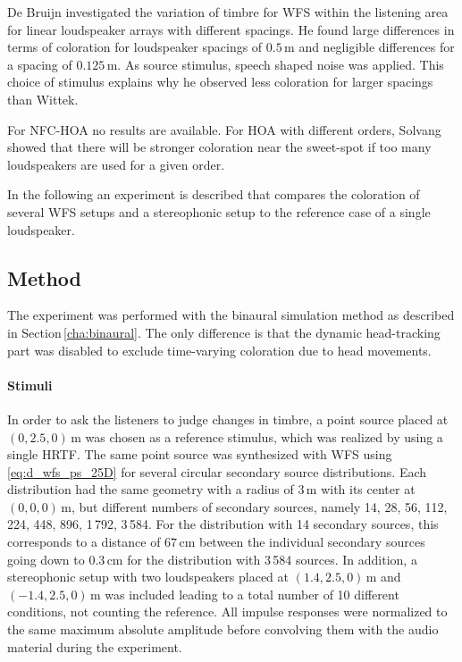 De Bruijn\autocite{DeBrujin2004} investigated the variation of
timbre for \ac{WFS} within the listening area for linear loudspeaker arrays
with different spacings.
He found large differences in terms of coloration for loudspeaker spacings of $0.5$\,m
and negligible differences for a spacing of $0.125$\,m. As source stimulus, speech shaped
noise was applied. This choice of stimulus explains why he observed less
coloration for larger spacings than Wittek.

For \ac{NFC-HOA} no results are available. For \ac{HOA} with different orders,
Solvang showed that there will be stronger coloration near
the sweet-spot if too many loudspeakers are used for a given order.

In the following an experiment is described that compares the coloration of several \ac{WFS} setups and a
stereophonic setup to the reference case of a single loudspeaker.


\subsection{Method}
\label{sec:coloration_method}
%

The experiment was performed with the binaural simulation method as described in
Section\,\ref{cha:binaural}. The only difference is that the dynamic
head-tracking part was disabled to exclude time-varying coloration due to head
movements.

\paragraph{Stimuli}
%
In order to ask the listeners to judge changes in timbre, a point source placed at
$(0,2.5,0)$\,m was chosen as a reference stimulus, which was realized by using a
single \ac{HRTF}. The same point source was synthesized with \ac{WFS} using
\eqref{eq:d_wfs_ps_25D} for several circular secondary source distributions.
Each distribution had the
same geometry with a radius of $3$\,m with its center at $(0,0,0)$\,m, but
different numbers of secondary sources, namely 14, 28, 56, 112, 224, 448, 896,
1\,792, 3\,584. For the distribution with 14 secondary sources, this corresponds to
a distance of $67$\,cm between the individual secondary sources going down
to $0.3$\,cm for the distribution with 3\,584 sources.
In addition, a stereophonic setup with two loudspeakers placed at $(1.4,2.5,0)$\,m
and $(-1.4,2.5,0)$\,m was included leading to a total number of 10 different
conditions, not counting the reference.
All impulse responses were normalized to the same maximum absolute amplitude
before convolving them with the audio material during the experiment.

